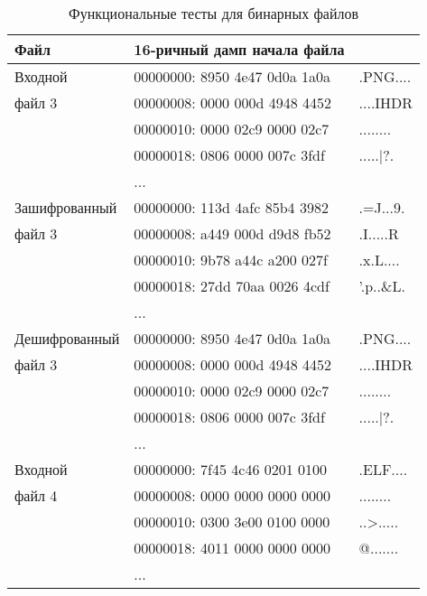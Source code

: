 \begin{table}[ht!]
    \begin{center}
        \caption{Функциональные тесты для бинарных файлов}
        \label{}
        \begin{tabular}{|l|ll|}
            \hline
            Файл & 16-ричный дамп начала файла & \\
			\hline
            \hline
            Входной       & 00000000: 8950 4e47 0d0a 1a0a & .PNG.... \\
            файл 3        & 00000008: 0000 000d 4948 4452 & ....IHDR \\
                          & 00000010: 0000 02c9 0000 02c7 & ........ \\
                          & 00000018: 0806 0000 007c 3fdf & .....|?. \\
                          & ... & \\
            \hline
            Зашифрованный & 00000000: 113d 4afc 85b4 3982 & .=J...9. \\
            файл 3        & 00000008: a449 000d d9d8 fb52 & .I.....R \\
                          & 00000010: 9b78 a44c a200 027f & .x.L.... \\
                          & 00000018: 27dd 70aa 0026 4cdf & '.p..\&L. \\
                          & ... & \\
            \hline
            Дешифрованный & 00000000: 8950 4e47 0d0a 1a0a & .PNG.... \\
            файл 3        & 00000008: 0000 000d 4948 4452 & ....IHDR \\
                          & 00000010: 0000 02c9 0000 02c7 & ........ \\
                          & 00000018: 0806 0000 007c 3fdf & .....|?. \\
                          & ... & \\
            \hline
            \hline
            Входной       & 00000000: 7f45 4c46 0201 0100 & .ELF.... \\
            файл 4        & 00000008: 0000 0000 0000 0000 & ........ \\
                          & 00000010: 0300 3e00 0100 0000 & ..>..... \\
                          & 00000018: 4011 0000 0000 0000 & @....... \\
                          & ... & \\
            \hline

\end{tabular}
\end{center}
\end{table}
